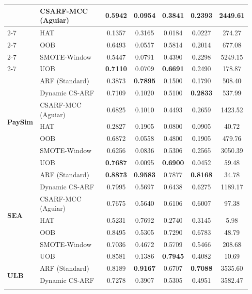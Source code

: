 \begin{table}[htbp]
{\begin{tabular}{|l|l|c|c|c|c|c|}
        & CSARF-MCC (Aguiar) & 0.5942 & 0.0954 & 0.3841 & 0.2393 & 2449.61 \\ \cline{2-7}
        & HAT & 0.1357 & 0.3165 & 0.0184 & 0.0227 & 274.27 \\ \cline{2-7}
        & OOB & 0.6493 & 0.0557 & 0.5814 & 0.2014 & 677.08 \\ \cline{2-7}
        & SMOTE-Window & 0.5447 & 0.0791 & 0.4390 & 0.2298 & 5249.15 \\ \cline{2-7}
        & UOB & \textbf{0.7110} & 0.0709 & \textbf{0.6691} & 0.2490 & 178.87 \\ \hline
        \multirow{7}{*}{\textbf{PaySim}} & ARF (Standard) & 0.3873 & \textbf{0.7895} & 0.1500 & 0.1790 & 508.40 \\ \cline{2-7}
        & Dynamic CS-ARF & 0.7109 & 0.1020 & 0.5100 & \textbf{0.2833} & 537.99 \\ \cline{2-7}
        & CSARF-MCC (Aguiar) & 0.6825 & 0.1010 & 0.4493 & 0.2659 & 1423.52 \\ \cline{2-7}
        & HAT & 0.2827 & 0.1905 & 0.0800 & 0.0905 & 40.72 \\ \cline{2-7}
        & OOB & 0.6872 & 0.0558 & 0.4800 & 0.1905 & 479.76 \\ \cline{2-7}
        & SMOTE-Window & 0.6256 & 0.0836 & 0.5306 & 0.2565 & 3050.39 \\ \cline{2-7}
        & UOB & \textbf{0.7687} & 0.0095 & \textbf{0.6900} & 0.0452 & 59.48 \\ \hline
        \multirow{7}{*}{\textbf{SEA}} & ARF (Standard) & \textbf{0.8873} & \textbf{0.9583} & 0.7877 & \textbf{0.8168} & 34.78 \\ \cline{2-7}
        & Dynamic CS-ARF & 0.7995 & 0.5697 & 0.6438 & 0.6275 & 1189.17 \\ \cline{2-7}
        & CSARF-MCC (Aguiar) & 0.7675 & 0.5640 & 0.6106 & 0.6007 & 97.38 \\ \cline{2-7}
        & HAT & 0.5231 & 0.7692 & 0.2740 & 0.3145 & 5.98 \\ \cline{2-7}
        & OOB & 0.8495 & 0.5305 & 0.7290 & 0.6783 & 48.79 \\ \cline{2-7}
        & SMOTE-Window & 0.7036 & 0.4672 & 0.5709 & 0.5466 & 208.68 \\ \cline{2-7}
        & UOB & 0.8581 & 0.1386 & \textbf{0.7945} & 0.4082 & 10.69 \\ \hline
        \multirow{7}{*}{\textbf{ULB}} & ARF (Standard) & 0.8189 & \textbf{0.9167} & 0.6707 & \textbf{0.7088} & 3535.60 \\ \cline{2-7}
        & Dynamic CS-ARF & 0.7278 & 0.3907 & 0.5305 & 0.4951 & 3582.47 \\ \cline{2-7}

\end{tabular}}
\end{table}
